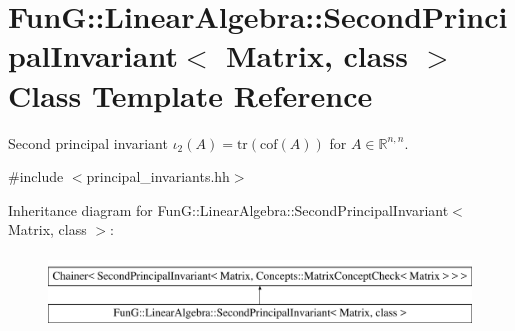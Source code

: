 \hypertarget{classFunG_1_1LinearAlgebra_1_1SecondPrincipalInvariant}{\section{Fun\-G\-:\-:Linear\-Algebra\-:\-:Second\-Principal\-Invariant$<$ Matrix, class $>$ Class Template Reference}
\label{classFunG_1_1LinearAlgebra_1_1SecondPrincipalInvariant}
}


Second principal invariant $ \iota_2(A)=\mathrm{tr}(\mathrm{cof}(A)) $ for $A\in\mathbb{R}^{n,n}$.  




{\ttfamily \#include $<$principal\-\_\-invariants.\-hh$>$}

Inheritance diagram for Fun\-G\-:\-:Linear\-Algebra\-:\-:Second\-Principal\-Invariant$<$ Matrix, class $>$\-:\begin{figure}[H]
\begin{center}
\leavevmode
\includegraphics[height=2.000000cm]{classFunG_1_1LinearAlgebra_1_1SecondPrincipalInvariant}
\end{center}
\end{figure}
